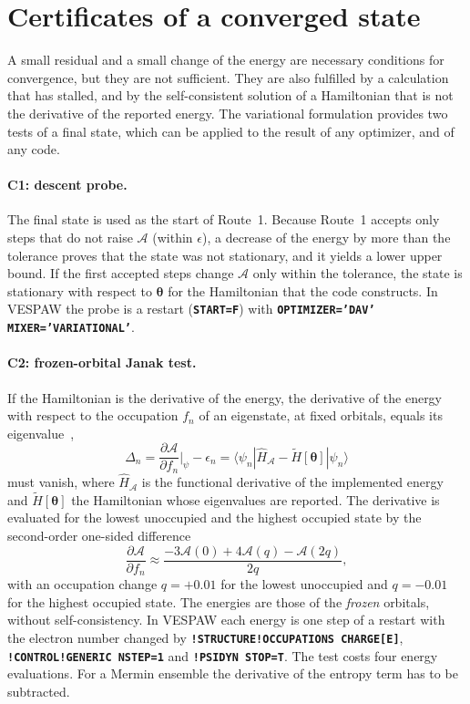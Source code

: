 \documentclass[11pt,a4paper,oneside]{book}
\newcommand{\vth}{\bm\theta}
\newcommand{\key}[1]{\textbf{\texttt{#1}}}
\newcommand{\bra}[1]{\langle #1|}
\newcommand{\ket}[1]{|#1\rangle}
\begin{document}
\section{Certificates of a converged state}\label{sec:certificates}

A small residual and a small change of the energy are necessary
conditions for convergence, but they are not sufficient. They are also
fulfilled by a calculation that has stalled, and by the self-consistent
solution of a Hamiltonian that is not the derivative of the reported
energy. The variational formulation provides two tests of a final
state, which can be applied to the result of any optimizer, and of any
code.

\paragraph{C1: descent probe.} The final state is used as the start of
Route~1. Because Route~1 accepts only steps that do not raise
$\mathcal A$ (within $\epsilon$), a decrease of the energy by more than
the tolerance proves that the state was not stationary, and it yields a
lower upper bound. If the first accepted steps change $\mathcal A$ only
within the tolerance, the state is stationary with respect to $\vth$
for the Hamiltonian that the code constructs. In VESPAW the probe is a
restart (\key{START=F}) with \key{OPTIMIZER='DAV' MIXER='VARIATIONAL'}.

\paragraph{C2: frozen-orbital Janak test.} If the Hamiltonian is the
derivative of the energy, the derivative of the energy with respect to
the occupation $f_n$ of an eigenstate, at fixed orbitals, equals its
eigenvalue~\cite{janak78_prb18_7165},
\begin{equation}
  \Delta_n=\frac{\partial\mathcal A}{\partial f_n}\Big|_{\psi}-\epsilon_n
  =\bra{\psi_n}\hat H_{\mathcal A}-\tilde H[\vth]\ket{\psi_n}
  \label{eq:janak}
\end{equation}
must vanish, where $\hat H_{\mathcal A}$ is the functional derivative of the
implemented energy and $\tilde H[\vth]$ the Hamiltonian whose eigenvalues
are reported. The derivative is evaluated for the lowest unoccupied and
the highest occupied state by the second-order one-sided difference
\begin{equation}
  \frac{\partial\mathcal A}{\partial f_n}\approx
  \frac{-3\mathcal A(0)+4\mathcal A(q)-\mathcal A(2q)}{2q},
\end{equation}
with an occupation change $q=+0.01$ for the lowest unoccupied and
$q=-0.01$ for the highest occupied state.
The energies are those of the \emph{frozen} orbitals, without
self-consistency. In VESPAW each energy is one step of a restart with
the electron number changed by \key{!STRUCTURE!OCCUPATIONS CHARGE[E]},
\key{!CONTROL!GENERIC NSTEP=1} and \key{!PSIDYN STOP=T}. The test costs four energy
evaluations. For a Mermin ensemble the derivative of the entropy term
has to be subtracted.
\end{document}
